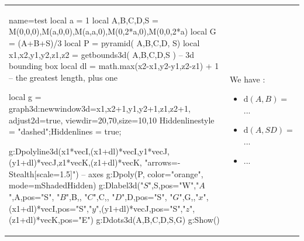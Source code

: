 \documentclass{standalone}
\begin{document}
\begin{tabular}{m{10cm}m{7cm}}
\begin{luadraw}{name=test}
local a = 1
local A,B,C,D,S = M(0,0,0),M(a,0,0),M(a,a,0),M(0,2*a,0),M(0,0,2*a)
local G = (A+B+S)/3
local P = pyramid( {A,B,C,D}, S)
local x1,x2,y1,y2,z1,z2 = getbounds3d( {A,B,C,D,S} ) -- 3d bounding box
local dl = math.max(x2-x1,y2-y1,z2-z1) + 1 -- the greatest length, plus one

local g = graph3d:new{window3d={x1,x2+1,y1,y2+1,z1,z2+1}, adjust2d=true, viewdir={20,70},size={10,10}}
Hiddenlinestyle = "dashed";Hiddenlines = true;

g:Dpolyline3d({{x1*vecI,(x1+dl)*vecI},{y1*vecJ,(y1+dl)*vecJ},{z1*vecK,(z1+dl)*vecK}}, "arrows={-Stealth[scale=1.5]}") -- axes
g:Dpoly(P, {color="orange", mode=mShadedHidden})
 g:Dlabel3d("$S$",S,{pos="W"},"$A$",A,{pos="S"}, "$B$",B,{}, "$C$",C,{}, "$D$",D,{pos="S"}, "$G$",G,{},"$x$",(x1+dl)*vecI,{pos="S"},"$y$",(y1+dl)*vecJ,{pos="S"},"$z$",(z1+dl)*vecK,{pos="E"})
g:Ddots3d({A,B,C,D,S,G})
g:Show()
\end{luadraw}
&
We have :
\begin{itemize}
    \item $\mathrm d(A,B) = $...
    \item $\mathrm d(A, SD) = $...
    \item ...
\end{itemize}
\end{tabular}
\end{document}
